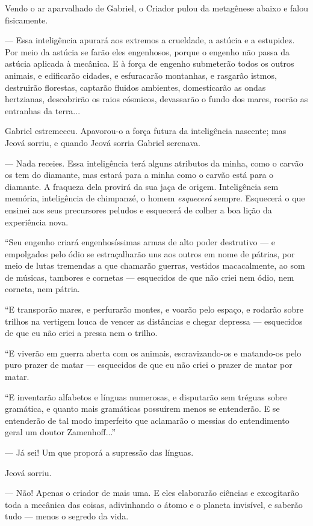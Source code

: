 Vendo o ar aparvalhado de Gabriel, o Criador pulou da metagênese abaixo
e falou fisicamente.

--- Essa inteligência apurará aos extremos a crueldade, a astúcia e a
estupidez. Por meio da astúcia se farão eles engenhosos, porque o
engenho não passa da astúcia aplicada à mecânica. E à força de engenho
submeterão todos os outros animais, e edificarão cidades, e esfuracarão
montanhas, e rasgarão istmos, destruirão florestas, captarão fluidos
ambientes, domesticarão as ondas hertzianas, descobrirão os raios
cósmicos, devassarão o fundo dos mares, roerão as entranhas da terra...

Gabriel estremeceu. Apavorou-o a força futura da inteligência nascente;
mas Jeová sorriu, e quando Jeová sorria Gabriel serenava.

--- Nada receies. Essa inteligência terá alguns atributos da minha, como
o carvão os tem do diamante, mas estará para a minha como o carvão está
para o diamante. A fraqueza dela provirá da sua jaça de origem.
Inteligência sem memória, inteligência de chimpanzé, o homem
\emph{esquecerá} sempre. Esquecerá o que ensinei aos seus precursores
peludos e esquecerá de colher a boa lição da experiência nova.

``Seu engenho criará engenhosíssimas armas de alto poder destrutivo ---
e empolgados pelo ódio se estraçalharão uns aos outros em nome de
pátrias, por meio de lutas tremendas a que chamarão guerras, vestidos
macacalmente, ao som de músicas, tambores e cornetas --- esquecidos de
que não criei nem ódio, nem corneta, nem pátria.

``E transporão mares, e perfurarão montes, e voarão pelo espaço, e
rodarão sobre trilhos na vertigem louca de vencer as distâncias e chegar
depressa --- esquecidos de que eu não criei a pressa nem o trilho.

``E viverão em guerra aberta com os animais, escravizando-os e
matando-os pelo puro prazer de matar --- esquecidos de que eu não criei
o prazer de matar por matar.

``E inventarão alfabetos e línguas numerosas, e disputarão sem tréguas
sobre gramática, e quanto mais gramáticas possuírem menos se entenderão.
E se entenderão de tal modo imperfeito que aclamarão o messias do
entendimento geral um doutor Zamenhoff...''

--- Já sei! Um que proporá a supressão das línguas.

Jeová sorriu.

--- Não! Apenas o criador de mais uma. E eles elaborarão ciências e
excogitarão toda a mecânica das coisas, adivinhando o átomo e o planeta
invisível, e saberão tudo --- menos o segredo da vida.

